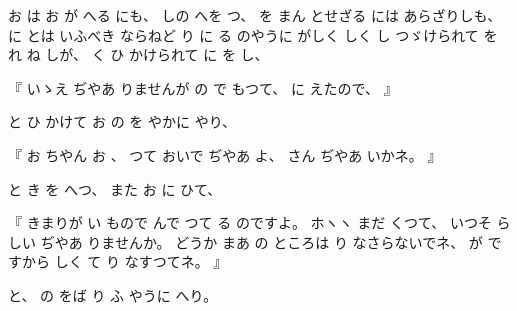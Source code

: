 
%
お
は
お
が
へる
にも、
%
しの
へを
つ、
%
を
まん
とせざる
には
あらざりしも、
%
に
とは
いふべき
ならねど
り
に
る
のやうに
がしく
しく
し
つゞけられて
を
%
れ
ね
しが、
%
く
ひ
かけられて
に
を
し、

%
『
いゝえ
ぢやあ
りませんが
の
で
もつて、
%
に
えたので、
』

%
と
ひ
かけて
お
の
を
やかに
やり、

%
『
お
ちやん
お
、
%
つて
おいで
ぢやあ
よ、
%
さん
ぢやあ
いかネ。
』

%
と
き
を
へつ、
%
また
お
に
ひて、

%
『
きまりが
い
もので
んで
つて
る
のですよ。
%
ホヽヽ
まだ
くつて、
%
いつそ
らしい
ぢやあ
りませんか。
%
どうか
まあ
の
ところは
り
なさらないでネ、
%
が
ですから
しく
て
り
なすつてネ。
』

%
と、
%
の
をば
り
ふ
やうに
へり。

